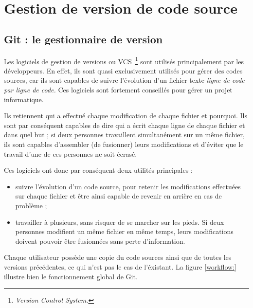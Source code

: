 \chapter{Gestion de version de code source}

\section{Git : le gestionnaire de version}

Les logiciels de gestion de versions ou VCS\, \footnote{\emph{Version Control
System.}} sont utilisés principalement par les développeurs. En effet, ils sont
quasi exclusivement utilisés pour gérer des codes sources, car ils sont
capables de suivre l’évolution d’un fichier texte \emph{ligne de code par ligne de
code.} Ces logiciels sont fortement conseillés pour gérer un projet
informatique.

Ils retiennent qui a effectué chaque modification de chaque fichier et
pourquoi. Ils sont par conséquent capables de dire qui a écrit chaque ligne de
chaque fichier et dans quel but ; si deux personnes travaillent simultanément
sur un même fichier, ils sont capables d’assembler (de fusionner) leurs
modifications et d’éviter que le travail d’une de ces personnes ne soit écrasé.

Ces logiciels ont donc par conséquent deux utilités principales :
\begin{itemize}
    \item suivre l’évolution d’un code source, pour retenir les modifications
effectuées sur chaque fichier et être ainsi capable de revenir en arrière en
cas de problème ;
    \item travailler à plusieurs, sans risquer de se marcher sur les pieds.
Si deux personnes modifient un même fichier en même temps, leurs modifications
doivent pouvoir être fusionnées sans perte d’information.
\end{itemize}

Chaque utilisateur possède une copie du code sources ainsi que de toutes les
versions précédentes, ce qui n'est pas le cas de l'éxistant. La figure
\ref{workflow:} illustre bien le fonctionnement global de Git.

